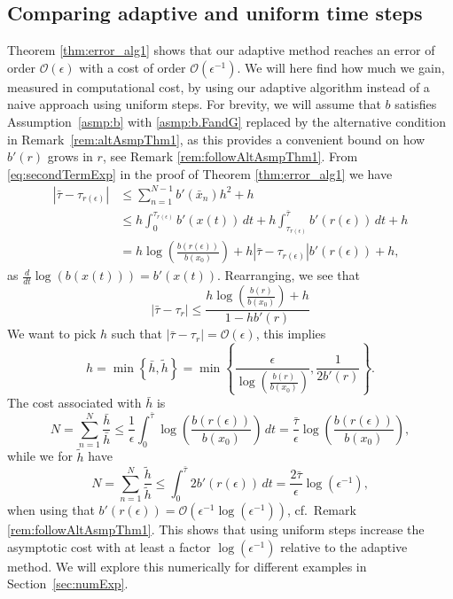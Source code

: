 \documentclass[a4paper, oneside, reqno]{amsart}
\newcommand{\abs}[1]{\left\lvert#1\right\rvert}
\theoremstyle{remark}
\begin{document}
\subsection{Comparing adaptive and uniform time steps}
\label{sec:adaptiveVsUniform1D}
Theorem \ref{thm:error_alg1} shows that our adaptive method reaches an error of order \(\mathcal{O}(\epsilon)\) with a cost of order \(\mathcal{O}(\epsilon^{-1})\). 
We will here find how much we gain, measured in computational cost, by using our adaptive algorithm instead of a naive approach using uniform steps. 
For brevity, we will assume that \(b\) satisfies Assumption~\ref{asmp:b} with \ref{asmp:b.FandG} replaced by the alternative condition in Remark~\ref{rem:altAsmpThm1}, as this provides a convenient bound on how \(b'(r)\) grows in $r$, see Remark \ref{rem:followAltAsmpThm1}. 
From \eqref{eq:secondTermExp} in the proof of Theorem \ref{thm:error_alg1} we have
\begin{align*}
    \abs{\bar\tau - \tau_{r(\epsilon)}} &\leq \sum_{n=1}^{N-1}b'(\bar x_n)h^2 + h\\
    &\leq h\int_{0}^{\tau_{r(\epsilon)}}b'(x(t))\,dt + h\int_{\tau_{r(\epsilon)}}^{\bar\tau}b'(r(\epsilon))\,dt + h \\
    &= h\log\left(\frac{b(r(\epsilon))}{b(x_0)}\right) + h\abs{\bar\tau - \tau_{r(\epsilon)}}b'(r(\epsilon)) + h,
\end{align*}
as \(\frac{d}{dt}\log(b(x(t))) = b'(x(t))\). Rearranging, we see that
\[\abs{\bar\tau - \tau_r} \leq \frac{h\log\left(\frac{b(r)}{b(x_0)}\right) + h}{1 - hb'(r)}\]
We want to pick \(h\) such that \(\abs{\bar\tau - \tau_r} = \mathcal{O}(\epsilon)\), this implies 
\[h = \min\left\{\bar h, \tilde h\right\} =\min\left\{\frac{\epsilon}{\log\left(\frac{b(r)}{b(x_0)}\right)}, \frac{1}{2b'(r)}\right\}.\]
The cost associated with \(\bar h\) is
\[N = \sum_{n=1}^N\frac{\bar h}{\bar h} \leq \frac{1}{\epsilon}\int_{0}^{\bar\tau}\log\left(\frac{b(r(\epsilon))}{b(x_0)}\right)\,dt = \frac{\bar\tau}{\epsilon}\log\left(\frac{b(r(\epsilon))}{b(x_0)}\right),\]
while we for \(\tilde h\) have
\[N =  \sum_{n=1}^N\frac{\tilde h}{\tilde h} \leq \int_0^{\bar\tau}2b'(r(\epsilon))\,dt = \frac{2\bar\tau}{\epsilon}\log(\epsilon^{-1}),\]
when using that \(b'(r(\epsilon)) = \mathcal{O}(\epsilon^{-1}\log(\epsilon^{-1}))\), 
cf.~Remark~ \ref{rem:followAltAsmpThm1}.
This shows that using uniform steps increase the asymptotic cost with at least a factor 
$\log(\epsilon^{-1})$ relative to the adaptive method. 
We will explore this numerically for different examples in Section~\ref{sec:numExp}.  
\end{document}
